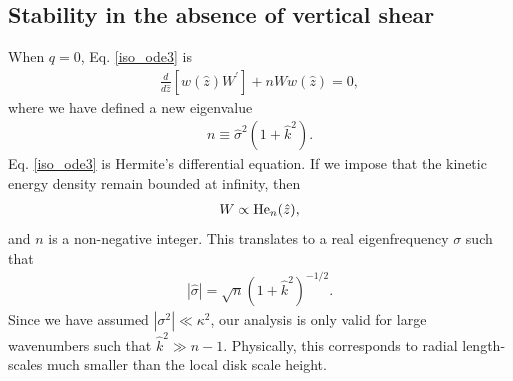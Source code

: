 \subsection{Stability in the absence of vertical shear}
When $q=0$, Eq. \ref{iso_ode3} is
\begin{align}\label{hermite_ode}
  \frac{d}{d\hat{z}}\left[w(\hat{z})W^\prime \right] + nW
  w(\hat{z}) =0, 
\end{align}
where we have defined a new eigenvalue
\begin{align}
  n \equiv \hat{\sigma}^2(1+\hat{k}^2). 
\end{align} 
Eq. \ref{iso_ode3} is Hermite's differential equation. If we impose
that the kinetic energy density remain bounded at infinity, then  
\begin{align}
  W \propto \operatorname{He}_n(\hat{z}),
\end{align}
and $n$ is a non-negative integer. This translates to a real
eigenfrequency $\sigma$ such that
\begin{align}
  \left|\hat{\sigma}\right| = \sqrt{n}
  \left(1+\hat{k}^2\right)^{-1/2}. 
\end{align}
Since we have assumed $|\sigma^2|\ll \kappa^2$, our analysis is only
valid for large wavenumbers such that $\hat{k}^2\gg 
n-1$. Physically, this corresponds to radial length-scales much
smaller than the local disk scale height. 

